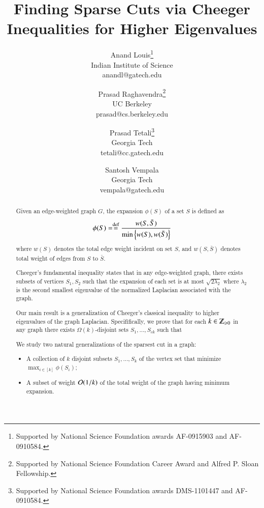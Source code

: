 \documentclass[11pt]{article}
\author{Anand Louis\thanks{Supported by National Science Foundation awards AF-0915903 and AF-0910584.}
	\\ Indian Institute of Science \\ anandl@gatech.edu  \and
 Prasad Raghavendra\thanks{ Supported by National Science Foundation Career Award and Alfred P. Sloan Fellowship.} 
	\\ UC Berkeley \\ prasad@cs.berkeley.edu \and 
Prasad Tetali\thanks{Supported by National Science Foundation awards DMS-1101447 and AF-0910584.} 
	\\ Georgia Tech \\ tetali@cc.gatech.edu \and
 Santosh Vempala\footnotemark[1] \\ Georgia Tech \\ vempala@gatech.edu }
\title{Finding Sparse Cuts via Cheeger Inequalities for Higher Eigenvalues}
\date{}
\begin{document}
\begin{titlepage}

\maketitle

\begin{abstract}

Given an edge-weighted graph $G$, the expansion $\phi(S)$ of a set $S$ is defined as
\[ \phi(S) = \stackrel{\textup{def}}{=} \frac{w(S,\bar{S})}{\min \left\{w(S), w(\bar{S})\right\}}\]
where $w(S)$ denotes the total edge weight incident on set $S$, and $w(S,\bar{S})$ denotes total weight of edges from $S$ to $\bar{S}$.

Cheeger's fundamental inequality states that in any edge-weighted graph, there exists subsets of vertices $S_1, S_2$ such that the expansion of each set is at most $\sqrt{2 \lambda_2}$ where $\lambda_2$ is the second smallest eigenvalue of the normalized Laplacian associated with the graph.
%

Our main result is a generalization of Cheeger's classical inequality to higher eigenvalues of the graph Laplacian.  Specififically, we prove that for each $k \in \N$ in any graph there exists $\Omega(k)$-disjoint sets $S_1,\ldots, S_{ck}$ such that
    
%
We study two natural generalizations of the sparsest cut in a graph: 
\begin{itemize}
\item A collection of $k$ disjoint subsets $S_1, \ldots, S_k$ of the vertex set that minimize $\max_{i \in [k]} \phi(S_i)$; 
\item A subset of weight $\mathcal{O}(1/k)$ of the total weight of the graph having minimum expansion. 
\end{itemize}


\end{abstract}
\end{titlepage}
\end{document}
